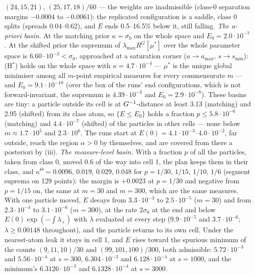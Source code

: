 $(24,15,21)$, $(25,17,18)/60$ --- the weights are inadmissible (class-0 separation margins $-0.0004$ to $-0.0061$):
the replicated configuration is a saddle, class 0 splits (spreads 0.04--0.62), and $E$ ends 0.5--16.5\% below it,
still falling. \emph{The a-priori basin.} At the matching prior $\kappa = \sigma_0$ on the whole space and
$E_0 = 2.0\cdot10^{-7}$. At the shifted prior the supremum of $\lambda_{\max}R^G[\mu^*]$ over the whole parameter
space is $6.60\cdot10^{-3} < \sigma_0$, approached at a saturation corner ($a\to a_{\max}$, $s\to s_{\min}$):
\textup{(H$^*$)} holds on the whole space with $\kappa = 4.7\cdot10^{-4}$ --- $\mu^*$ is the unique global
minimiser among all $m$-point empirical measures for every commensurate $m$ --- and $E_0 = 9.1\cdot10^{-10}$ (over
the box of the runs' end configurations, which is not forward-invariant, the supremum is $4.39\cdot10^{-3}$ and
$E_0 = 2.9\cdot10^{-8}$). These basins are tiny: a particle outside its cell is at $G^{-1}$-distance at least 3.13
(matching) and 2.95 (shifted) from its class atom, so $\{E\le E_0\}$ holds a fraction $p\le5.8\cdot10^{-6}$
(matching) and $4.4\cdot10^{-7}$ (shifted) of the particles in other cells --- none below $m\approx1.7\cdot10^5$ and
$2.3\cdot10^6$. The runs start at $E(0) = 4.1\cdot10^{-3}$--$4.0\cdot10^{-2}$, far outside, reach the region
$\alpha > 0$ by themselves, and are covered from there a posteriori by (iii). \emph{The measure-level basin.} With a
fraction $p$ of all the particles, taken from class 0, moved 0.6 of the way into cell 1, the plan keeps them in their
class, and $\kappa^\Theta = 0.0096$, $0.019$, $0.029$, $0.048$ for $p = 1/30$, $1/15$, $1/10$, $1/6$ (segment
suprema on 129 points): the margin is $+0.0023$ at $p = 1/30$ and negative from $p = 1/15$ on, the same at $m = 30$
and $m = 300$, which are the same measures. With one particle moved, $E$ decays from $3.3\cdot10^{-3}$ to
$2.5\cdot10^{-5}$ ($m = 30$) and from $2.3\cdot10^{-4}$ to $3.1\cdot10^{-6}$ ($m = 300$), at the rate $2\sigma_0$ at
the end and below $E(0)\exp(-\int\lambda_+)$ with $\lambda$ evaluated at every step ($9.9\cdot10^{-5}$ and
$3.7\cdot10^{-6}$; $\lambda\ge0.00148$ throughout), and the particle returns to its own cell. Under the nearest-atom
leak it stays in cell 1, and $E$ rises toward the spurious minimum of the counts $(9,11,10)/30$ and
$(99,101,100)/300$, both admissible: $5.72\cdot10^{-3}$ and $5.56\cdot10^{-4}$ at $s = 300$, $6.304\cdot10^{-3}$ and
$6.128\cdot10^{-4}$ at $s = 1000$, and the minimum's $6.3126\cdot10^{-3}$ and $6.1328\cdot10^{-4}$ at $s = 3000$.


